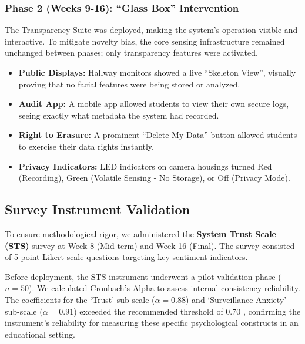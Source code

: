 \documentclass[conference]{IEEEtran}
\begin{document}
\subsubsection{Phase 2 (Weeks 9-16): ``Glass Box'' Intervention}
The Transparency Suite was deployed, making the system's operation visible and interactive. To mitigate novelty bias, the core sensing infrastructure remained unchanged between phases; only transparency features were activated.
\begin{itemize}
    \item \textbf{Public Displays:} Hallway monitors showed a live ``Skeleton View'', visually proving that no facial features were being stored or analyzed.
    \item \textbf{Audit App:} A mobile app allowed students to view their own secure logs, seeing exactly what metadata the system had recorded.
    \item \textbf{Right to Erasure:} A prominent ``Delete My Data'' button allowed students to exercise their data rights instantly.
    \item \textbf{Privacy Indicators:} LED indicators on camera housings turned Red (Recording), Green (Volatile Sensing - No Storage), or Off (Privacy Mode).
\end{itemize}

\subsection{Survey Instrument Validation}
To ensure methodological rigor, we administered the \textbf{System Trust Scale (STS)} survey at Week 8 (Mid-term) and Week 16 (Final). The survey consisted of 5-point Likert scale questions targeting key sentiment indicators.

Before deployment, the STS instrument underwent a pilot validation phase ($n=50$). We calculated Cronbach's Alpha to assess internal consistency reliability. The coefficients for the `Trust' sub-scale ($\alpha = 0.88$) and `Surveillance Anxiety' sub-scale ($\alpha = 0.91$) exceeded the recommended threshold of 0.70 \cite{b25}, confirming the instrument's reliability for measuring these specific psychological constructs in an educational setting.
\end{document}
